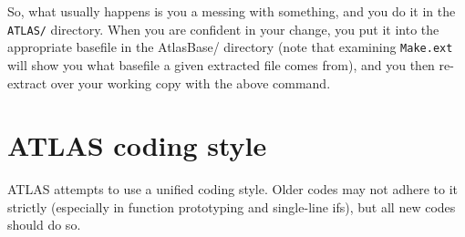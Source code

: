 \documentclass[11pt]{article}
\begin{document}
So, what usually happens is you a messing with something, and you do it in
the {\tt ATLAS/} directory.  When you are confident in your change,
you put it into the appropriate basefile in the AtlasBase/ directory
(note that examining {\tt Make.ext} will show you what basefile a given
extracted file comes from), and you then re-extract over your working
copy with the above command.

\section{ATLAS coding style}

ATLAS attempts to use a unified coding style.  Older codes may not adhere
to it strictly (especially in function prototyping and single-line ifs), 
but all new codes should do so.
\end{document}
